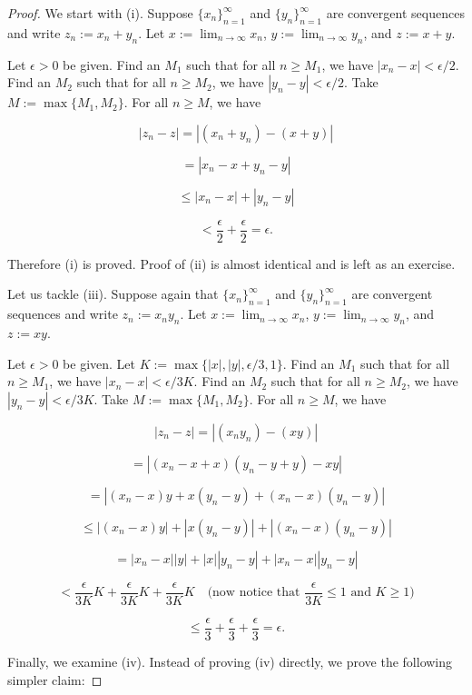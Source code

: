 \documentclass[../main.tex]{subfiles}
\begin{document}
    
    \begin{proof}
        We start with (i). Suppose $\{x_n\}_{n=1}^{\infty}$ and $\{y_n\}_{n=1}^{\infty}$ are convergent sequences and write
$z_n := x_n + y_n$. Let $x := \lim_{n \to \infty} x_n$, $y := \lim_{n \to \infty} y_n$, and $z := x + y$.

Let $\epsilon > 0$ be given. Find an $M_1$ such that for all $n \geq M_1$, we have $|x_n - x| < \epsilon/2$. Find an $M_2$ such that for all $n \geq M_2$, we have $|y_n - y| < \epsilon/2$. Take $M := \max\{M_1, M_2\}$. For all $n \geq M$, we have

\[
|z_n - z| = |(x_n + y_n) - (x + y)|
\]

\[
= |x_n - x + y_n - y|
\]

\[
\leq |x_n - x| + |y_n - y|
\]

\[
< \frac{\epsilon}{2} + \frac{\epsilon}{2} = \epsilon.
\]

Therefore (i) is proved. Proof of (ii) is almost identical and is left as an exercise.

Let us tackle (iii). Suppose again that $\{x_n\}_{n=1}^{\infty}$ and $\{y_n\}_{n=1}^{\infty}$ are convergent sequences and write $z_n := x_n y_n$. Let $x := \lim_{n \to \infty} x_n$, $y := \lim_{n \to \infty} y_n$, and $z := xy$.

Let $\epsilon > 0$ be given. Let $K := \max\{|x|, |y|, \epsilon/3, 1\}$. Find an $M_1$ such that for all $n \geq M_1$, we have $|x_n - x| < \epsilon/3K$. Find an $M_2$ such that for all $n \geq M_2$, we have $|y_n - y| < \epsilon/3K$. Take $M := \max\{M_1, M_2\}$. For all $n \geq M$, we have

\[
|z_n - z| = |(x_n y_n) - (xy)|
\]

\[
= |(x_n - x + x)(y_n - y + y) - xy|
\]

\[
= |(x_n - x)y + x(y_n - y) + (x_n - x)(y_n - y)|
\]

\[
\leq |(x_n - x)y| + |x(y_n - y)| + |(x_n - x)(y_n - y)|
\]

\[
= |x_n - x| |y| + |x| |y_n - y| + |x_n - x| |y_n - y|
\]

\[
< \frac{\epsilon}{3K} K + \frac{\epsilon}{3K} K + \frac{\epsilon}{3K} K
\quad \text{(now notice that } \frac{\epsilon}{3K} \leq 1 \text{ and } K \geq 1 \text{)}
\]

\[
\leq \frac{\epsilon}{3} + \frac{\epsilon}{3} + \frac{\epsilon}{3} = \epsilon.
\]

Finally, we examine (iv). Instead of proving (iv) directly, we prove the following simpler claim:


\end{proof}
\end{document}

